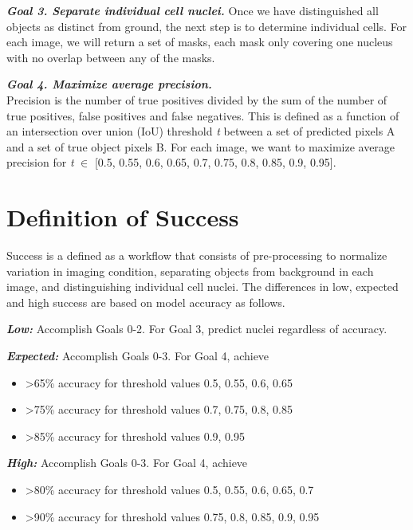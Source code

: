 \documentclass[11pt]{article}
\begin{document}
\textbf{\textit{Goal 3. Separate individual cell nuclei.}} Once we have distinguished all objects as distinct from ground, the next step is to determine individual cells. For each image, we will return a set of masks, each mask only covering one nucleus with no overlap between any of the masks.

\textbf{\textit{Goal 4. Maximize average precision.}}\\
Precision is the number of true positives divided by the sum of the number of true positives, false positives and false negatives. This is defined as a function of an intersection over union (IoU) threshold \textit{t} between a set of predicted pixels A and a set of true object pixels B. For each image, we want to maximize average precision for \textit{t} $\in$ [0.5, 0.55, 0.6, 0.65, 0.7, 0.75, 0.8, 0.85, 0.9, 0.95].

\section{Definition of Success}

Success is a defined as a workflow that consists of pre-processing to normalize variation in imaging condition, separating objects from background in each image, and distinguishing individual cell nuclei. The differences in low, expected and high success are based on model accuracy as follows.

\textbf{\textit{Low:}} Accomplish Goals 0-2. For Goal 3, predict nuclei regardless of accuracy.

\textbf{\textit{Expected:}} Accomplish Goals 0-3. For Goal 4, achieve 
\begin{itemize}
\item \textgreater 65\% accuracy for threshold values 0.5, 0.55, 0.6, 0.65
\item \textgreater 75\% accuracy for threshold values 0.7, 0.75, 0.8, 0.85
\item \textgreater 85\% accuracy for threshold values 0.9, 0.95
\end{itemize}

\textbf{\textit{High:}} Accomplish Goals 0-3. For Goal 4, achieve
\begin{itemize}
\item \textgreater 80\% accuracy for threshold values 0.5, 0.55, 0.6, 0.65, 0.7
\item \textgreater 90\% accuracy for threshold values 0.75, 0.8, 0.85, 0.9, 0.95
\end{itemize}
\end{document}
